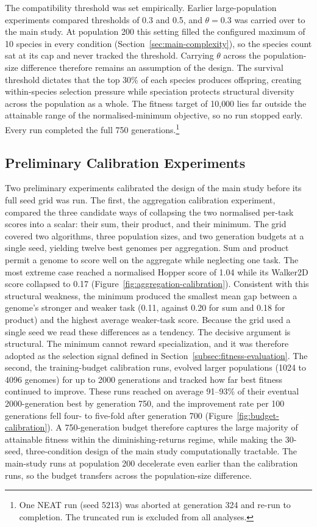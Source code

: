 \documentclass[12pt]{article}
\begin{document}
The compatibility threshold was set empirically.
Earlier large-population experiments compared thresholds of 0.3 and 0.5, and $\theta = 0.3$ was carried over to the main study.
At population 200 this setting filled the configured maximum of 10 species in every condition (Section~\ref{sec:main-complexity}), so the species count sat at its cap and never tracked the threshold. Carrying $\theta$ across the population-size difference therefore remains an assumption of the design.
The survival threshold dictates that the top 30\% of each species produces offspring, creating within-species selection pressure while speciation protects structural diversity across the population as a whole.
The fitness target of 10{,}000 lies far outside the attainable range of the normalised-minimum objective, so no run stopped early. Every run completed the full 750 generations.\footnote{One NEAT run (seed 5213) was aborted at generation 324 and re-run to completion. The truncated run is excluded from all analyses.}

\subsection{Preliminary Calibration Experiments}
\label{subsec:calibration}

Two preliminary experiments calibrated the design of the main study before its full seed grid was run.
The first, the aggregation calibration experiment, compared the three candidate ways of collapsing the two normalised per-task scores into a scalar: their sum, their product, and their minimum.
The grid covered two algorithms, three population sizes, and two generation budgets at a single seed, yielding twelve best genomes per aggregation.
Sum and product permit a genome to score well on the aggregate while neglecting one task. The most extreme case reached a normalised Hopper score of 1.04 while its Walker2D score collapsed to 0.17 (Figure~\ref{fig:aggregation-calibration}).
Consistent with this structural weakness, the minimum produced the smallest mean gap between a genome's stronger and weaker task (0.11, against 0.20 for sum and 0.18 for product) and the highest average weaker-task score.
Because the grid used a single seed we read these differences as a tendency. The decisive argument is structural.
The minimum cannot reward specialization, and it was therefore adopted as the selection signal defined in Section~\ref{subsec:fitness-evaluation}.
The second, the training-budget calibration runs, evolved larger populations (1024 to 4096 genomes) for up to 2000 generations and tracked how far best fitness continued to improve.
These runs reached on average 91--93\% of their eventual 2000-generation best by generation 750, and the improvement rate per 100 generations fell four- to five-fold after generation 700 (Figure~\ref{fig:budget-calibration}).
A 750-generation budget therefore captures the large majority of attainable fitness within the diminishing-returns regime, while making the 30-seed, three-condition design of the main study computationally tractable.
The main-study runs at population 200 decelerate even earlier than the calibration runs, so the budget transfers across the population-size difference.
\end{document}
